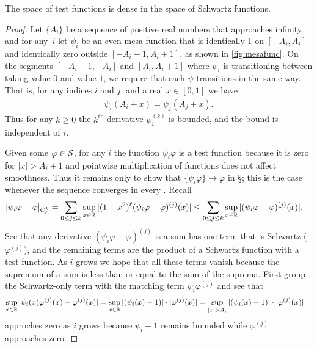     \begin{lemma}
      \label{lemma:ddenseins}
      The space of test functions is dense in the space of Schwartz functions.
    \end{lemma}
    \begin{proof}
      Let $\{A_i\}$ be a sequence of positive real numbers that approaches infinity and for any~$i$ let $\psi_i$ be an even mesa function that is identically 1 on $[-A_i,A_i]$ and identically zero outside $[-A_i-1,A_i+1]$, as shown in \cref{fig:mesafunc}.
      On the segments $[-A_i-1,-A_i]$ and $[A_i,A_i+1]$ where $\psi_i$ is transitioning between taking value $0$ and value $1$, we require that each $\psi$ transitions in the same way.
      That is, for any indices $i$ and $j$, and a real $x\in[0,1]$ we have
      \begin{align*}
        \psi_i(A_i+x) = \psi_j(A_j+x) \text{.}
      \end{align*}
      Thus for any $k\ge0$ the $k^{\text{th}}$ derivative $\psi_i^{(k)}$ is bounded, and the bound is independent of $i$.

      Given some $\varphi\in\S$, for any $i$ the function $\psi_i\varphi$ is a test function because it is zero for $|x|>A_i+1$ and pointwise multiplication of functions does not affect smoothness.
      Thus it remains only to show that $\{\psi_i\varphi\}\rightarrow\varphi$ in \S; this is the case whenever the sequence converges in every \Ckl.
      Recall
      \begin{align*}
        |\psi_i\varphi - \varphi|_\Ckl
        &= \sum_{0\le j\le k} \sup_{x\in\R} |(1+x^2)^\ell (\psi_i\varphi-\varphi)^{(j)}(x)|
        \le \sum_{0\le j\le k} \sup_{x\in\R} |(\psi_i\varphi-\varphi)^{(j)}(x)| \text{.}
      \end{align*}
      See that any derivative $(\psi_i\varphi-\varphi)^{(j)}$ is a sum has one term that is Schwartz ($\varphi^{(j)}$), and the remaining terms are the product of a Schwartz function with a test function.
      As $i$ grows we hope that all these terms vanish because the supremum of a sum is less than or equal to the sum of the suprema.
      First group the Schwartz-only term with the matching term $\psi_i\varphi^{(j)}$ and see that 
      \begin{align*}
        \sup_{x\in\R} |\psi_i(x)\varphi^{(j)}(x)-\varphi^{(j)}(x)|
        &= \sup_{x\in\R} |(\psi_i(x)-1)|\cdot|\varphi^{(j)}(x)|
        = \sup_{|x|>A_i} |(\psi_i(x)-1)|\cdot|\varphi^{(j)}(x)|
      \end{align*}
      approches zero as $i$ grows because $\psi_i-1$ remains bounded while $\varphi^{(j)}$ approaches zero.
      

\end{proof}
